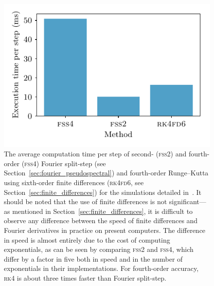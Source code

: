 \begin{figure}[t]
    \centerfloat
    \includegraphics{figures/numerics/method_speeds.pdf}
    \caption{The average computation time per step of second- (\textsc{fss2}) and fourth-order (\textsc{fss4}) Fourier split-step (see Section~\ref{sec:fourier_pseudospectral}) and fourth-order Runge--Kutta using sixth-order finite differences (\textsc{rk4fd6}, see Section~\ref{sec:finite_differences}) for the simulations detailed in~. It should be noted that the use of finite differences is not significant---as mentioned in Section~\ref{sec:finite_differences}, it is difficult to observe any difference between the speed of finite differences and Fourier derivatives in practice on present computers. The difference in speed is almost entirely due to the cost of computing exponentials, as can be seen by comparing \textsc{fss2} and \textsc{fss4}, which differ by a factor in five both in speed and in the number of exponentials in their implementations. For fourth-order accuracy, \textsc{rk4} is about three times faster than Fourier split-step.}
    \label{fig:method_speeds}
\end{figure}

